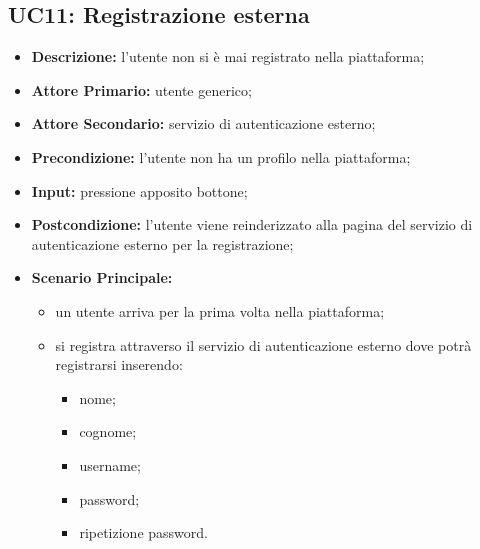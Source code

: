 \subsection{UC11: Registrazione esterna}
\label{sec:UC11}
\begin{itemize}
    \item \textbf{Descrizione:} l'utente non si è mai registrato nella piattaforma;
    \item \textbf{Attore Primario:} utente generico;
    \item \textbf{Attore Secondario:} servizio di autenticazione esterno;
    \item \textbf{Precondizione:} l'utente non ha un profilo nella piattaforma;
    \item \textbf{Input:} pressione apposito bottone;
    \item \textbf{Postcondizione:} l'utente viene reinderizzato alla pagina del servizio di autenticazione esterno per la registrazione;
    \item \textbf{Scenario Principale:}
          \begin{itemize}
              \item un utente arriva per la prima volta nella piattaforma;
              \item si registra attraverso il servizio di autenticazione esterno dove potrà registrarsi inserendo:
                    \begin{itemize}
                        \item nome;
                        \item cognome;
                        \item username;
                        \item password;
                        \item ripetizione password.
                    \end{itemize}
          \end{itemize}
\end{itemize}
